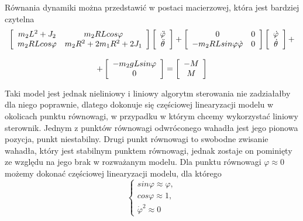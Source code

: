 Równania dynamiki można przedstawić w postaci macierzowej, która jest bardziej czytelna
$$
    \begin{array}{cc}
        \left[ \begin{array}{cc}
        m_2L^2 + J_2 & m_2RLcos\varphi \\
        m_2RLcos\varphi & m_2R^2 + 2m_1R^2 + 2J_1
        \end{array} \right]
        \left[ \begin{array}{c}
        \Ddot{\varphi} \\
        \Ddot{\theta}
        \end{array} \right]
        +
        \left[ \begin{array}{cc}
        0 & 0 \\
        -m_2RLsin\varphi\dot{\varphi} & 0
        \end{array} \right]
        \left[ \begin{array}{c}
        \dot{\varphi} \\
        \dot{\theta}
        \end{array} \right]
        + \\ \\ +
        \left[ \begin{array}{c}
        -m_2gLsin\varphi \\
        0
        \end{array} \right]
        = 
        \left[ \begin{array}{c}
        -M \\
        M
        \end{array} \right]
    \end{array}
$$

Taki model jest jednak nieliniowy i liniowy algorytm sterowania nie zadziałałby dla niego poprawnie, dlatego dokonuje się częściowej linearyzacji modelu w okolicach punktu równowagi, w przypadku w którym chcemy wykorzystać liniowy sterownik. Jednym z punktów równowagi odwróconego wahadła jest jego pionowa pozycja, punkt niestabilny. Drugi punkt równowagi to swobodne zwisanie wahadła, który jest stabilnym punktem równowagi, jednak zostaje on pominięty ze względu na jego brak w rozważanym modelu. Dla punktu równowagi $\varphi \approx 0$ możemy dokonać częściowej linearyzacji modelu, dla którego
$$
    \left\{
    \begin{array}{c}
    sin\varphi \approx \varphi, \\
    cos\varphi \approx 1, \\
    \dot{\varphi}^2 \approx 0
    \end{array}
    \right.
$$

